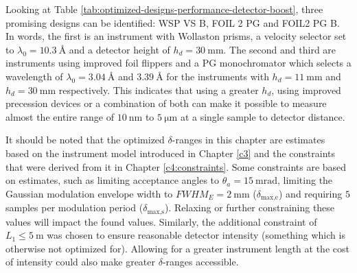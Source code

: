 Looking at Table \ref{tab:optimized-designs-performance-detector-boost}, three promising designs can be identified: WSP VS B, FOIL 2 PG and FOIL2 PG B. In words, the first is an instrument with Wollaston prisms, a velocity selector set to $\lambda_0 = \SI{10.3}{\angstrom}$ and a detector height of $h_d = \SI{30}{\milli\meter}$. The second and third are instruments using improved foil flippers and a PG monochromator which selects a wavelength of $\lambda_0 = \SI{3.04}{\angstrom}$ and $\SI{3.39}{\angstrom}$ for the instruments with $h_d = \SI{11}{\milli\meter}$ and $h_d = \SI{30}{\milli\meter}$ respectively. This indicates that using a greater $h_d$, using improved precession devices or a combination of both can make it possible to measure almost the entire range of $\SI{10}{\nano\meter}$ to $ \SI{5}{\micro\meter}$ at a single sample to detector distance. 

It should be noted that the optimized $\delta$-ranges in this chapter are estimates based on the instrument model introduced in Chapter \ref{c3} and the constraints that were derived from it in Chapter \ref{c4:constraints}. Some constraints are based on estimates, such as limiting acceptance angles to $\theta_a = \SI{15}{\milli\radian}$, limiting the Gaussian modulation envelope width to $FWHM_E = \SI{2}{\milli\meter}$ ($\delta_{\text{max,e}}$) and requiring $5$ samples per modulation period ($\delta_{\text{max,s}}$). Relaxing or further constraining these values will impact the found values. Similarly, the additional constraint of $L_1 \leq \SI{5}{\meter}$ was chosen to ensure reasonable detector intensity (something which is otherwise not optimized for). Allowing for a greater instrument length at the cost of intensity could also make greater $\delta$-ranges accessible.


